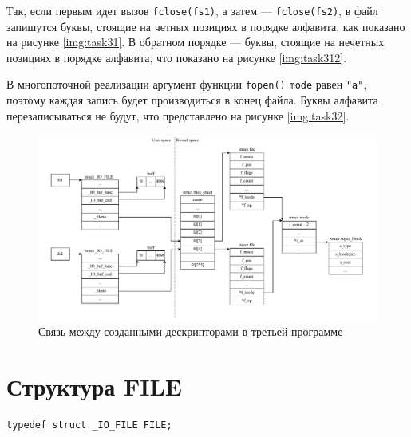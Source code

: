 Так, если первым идет вызов \texttt{fclose(fs1)}, а затем --- \texttt{fclose(fs2)}, в файл запишутся буквы, стоящие на четных позициях в порядке алфавита, как показано на рисунке \ref{img:task31}. В обратном порядке --- буквы, стоящие на нечетных позициях в порядке алфавита, что показано на рисунке \ref{img:task312}.

В многопоточной реализации аргумент функции \texttt{fopen()} \texttt{mode} равен \texttt{"a"}, поэтому каждая запись будет производиться в конец файла. Буквы алфавита перезаписываться не будут, что представлено на рисунке \ref{img:task32}.

\begin{figure}[H]
	\begin{center}
		\includegraphics[scale=0.5]{img/task3.pdf}
	\end{center}
	\captionsetup{justification=centering}
	\caption{Связь между созданными дескрипторами в третьей программе}
	\label{img:task3}
\end{figure}

\chapter{Структура FILE}

\begin{center}
    \captionsetup{justification=raggedright,singlelinecheck=off}
    \begin{lstlisting}[label=lst:FILE,caption=Описание структуры FILE в файле /usr/include/x86\_64-linux-gnu/bits/types/FILE.h]
typedef struct _IO_FILE FILE;
\end{lstlisting}
\end{center}

